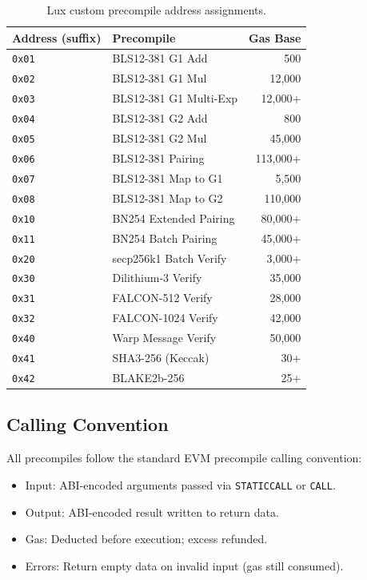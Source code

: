 \documentclass[11pt,a4paper]{article}
\begin{document}
\begin{table}[H]
\centering
\caption{Lux custom precompile address assignments.}
\label{tab:addresses}
\begin{tabular}{llr}
\toprule
\textbf{Address (suffix)} & \textbf{Precompile} & \textbf{Gas Base} \\
\midrule
\texttt{0x01} & BLS12-381 G1 Add & 500 \\
\texttt{0x02} & BLS12-381 G1 Mul & 12,000 \\
\texttt{0x03} & BLS12-381 G1 Multi-Exp & 12,000$+$ \\
\texttt{0x04} & BLS12-381 G2 Add & 800 \\
\texttt{0x05} & BLS12-381 G2 Mul & 45,000 \\
\texttt{0x06} & BLS12-381 Pairing & 113,000$+$ \\
\texttt{0x07} & BLS12-381 Map to G1 & 5,500 \\
\texttt{0x08} & BLS12-381 Map to G2 & 110,000 \\
\texttt{0x10} & BN254 Extended Pairing & 80,000$+$ \\
\texttt{0x11} & BN254 Batch Pairing & 45,000$+$ \\
\texttt{0x20} & secp256k1 Batch Verify & 3,000$+$ \\
\texttt{0x30} & Dilithium-3 Verify & 35,000 \\
\texttt{0x31} & FALCON-512 Verify & 28,000 \\
\texttt{0x32} & FALCON-1024 Verify & 42,000 \\
\texttt{0x40} & Warp Message Verify & 50,000 \\
\texttt{0x41} & SHA3-256 (Keccak) & 30$+$ \\
\texttt{0x42} & BLAKE2b-256 & 25$+$ \\
\bottomrule
\end{tabular}
\end{table}

\subsection{Calling Convention}

All precompiles follow the standard EVM precompile calling convention:
\begin{itemize}
    \item Input: ABI-encoded arguments passed via \texttt{STATICCALL} or \texttt{CALL}.
    \item Output: ABI-encoded result written to return data.
    \item Gas: Deducted before execution; excess refunded.
    \item Errors: Return empty data on invalid input (gas still consumed).
\end{itemize}
\end{document}
